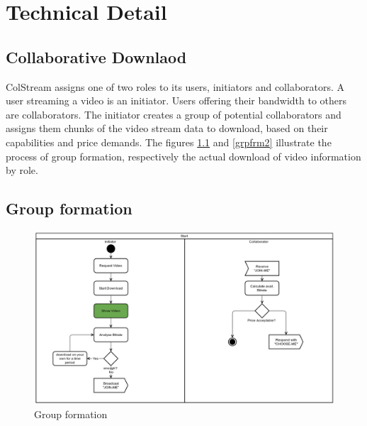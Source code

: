 \chapter{Technical Detail}

\section{Collaborative Downlaod}
ColStream assigns one of two roles to its users, initiators and collaborators. A user streaming a video is an initiator. Users offering their bandwidth to others are collaborators. The initiator creates a group of potential collaborators and assigns them chunks of the video stream data to download, based on their capabilities and price demands. The figures \ref{grpfrm1} and \ref{grpfrm2} illustrate the process of group formation, respectively the actual download of video information by role. 

\section{Group formation}

\begin{figure}[hbtp]
\centering
\includegraphics[scale=.6]{figures/Workflow_1.png}
\caption{Group formation}
\label{grpfrm1}
\end{figure}


